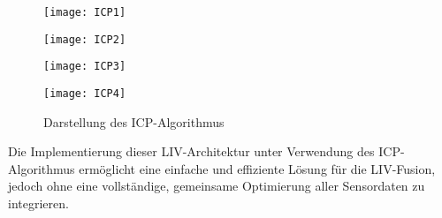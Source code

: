 \begin{figure}[ht]
    \centering
    \begin{minipage}{0.24\textwidth}
        \centering
        \texttt{[image: ICP1]}
    \end{minipage}
    \hfill
    \begin{minipage}{0.24\textwidth}
        \centering
        \texttt{[image: ICP2]}
    \end{minipage}
    \hfill
    \begin{minipage}{0.24\textwidth}
        \centering
        \texttt{[image: ICP3]}
    \end{minipage}
    \hfill
    \begin{minipage}{0.24\textwidth}
        \centering
        \texttt{[image: ICP4]}
    \end{minipage}
    \caption{Darstellung des ICP-Algorithmus \cite{bogoslavskyi2017icp}}
    \label{fig:ICP}
\end{figure}

Die Implementierung dieser LIV-Architektur unter Verwendung des ICP-Algorithmus ermöglicht eine einfache und effiziente Lösung für die LIV-Fusion, jedoch ohne eine vollständige, gemeinsame Optimierung aller Sensordaten zu integrieren. \cite{zhang2024lidarslam}